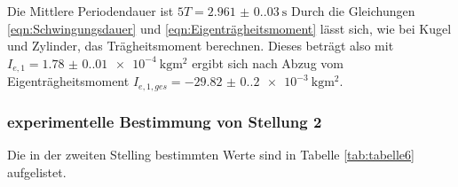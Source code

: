     Die Mittlere Periodendauer ist $5T=\qty{2.961(0.03)}{\second}$ 
    Durch die Gleichungen \ref{eqn:Schwingungsdauer} und \ref{eqn:Eigenträgheitsmoment} lässt sich, wie bei Kugel und Zylinder, das Trägheitsmoment berechnen.
    Dieses beträgt also mit $I_{e,1}=\qty{1.78(0.01)e-4}{\kilo\gram\meter\squared}$ ergibt sich nach Abzug vom Eigenträgheitsmoment
    $I_{e,1,ges}=\qty{-29.82(0.20)e-3}{\kilo\gram\meter\squared}$.



    \subsubsection{experimentelle Bestimmung von Stellung 2}
    Die in der zweiten Stelling bestimmten Werte sind in Tabelle \ref{tab:tabelle6} aufgelistet.

